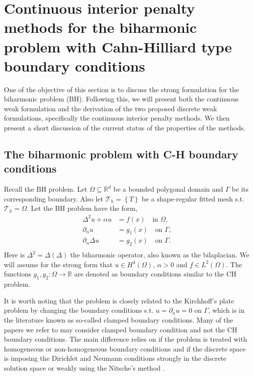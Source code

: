 
\section{Continuous interior penalty methods for the biharmonic problem with Cahn-Hilliard type boundary conditions}%
\label{sec:CIP_biharmonic_problem}

One of the objective of this section is to discuss the strong formulation for the biharmonic problem (BH).
Following this, we will present both the continuous weak formulation and the derivation of the two proposed discrete weak formulations, specifically the continuous interior penalty methods.
We then present a short discussion of the current status of the properties of the methods.

\subsection{The biharmonic problem with C-H boundary conditions}%
\label{sub:the_biharmonic_problem_with_c_h_boundary_conditions}

Recall the BH problem.
Let $\Omega \subseteq    \mathbb{R} ^d$ be a bounded polygonal domain and $\Gamma $ be its corresponding boundary. Also let $\mathcal{T}_{h} = \left\{ T \right\} $ be a shape-regular fitted mesh s.t. $\mathcal{T}_{h} = \Omega $. Let the BH problem have the form,
\begin{equation}
\label{eq:bi_problem}
\begin{split}
    \Delta^2  u  + \alpha  u  & = f( x)  \quad \text{in } \Omega,   \\
    \partial _{n} u & = g_{1}(x)   \quad \text{on } \Gamma ,  \\
    \partial _{n} \Delta  u & = g_{2}( x)   \quad \text{on } \Gamma .  \\
\end{split}
\end{equation}
Here is $\Delta ^2 = \Delta  \left( \Delta  \right) $ the biharmonic operator, also known as the bilaplacian. We will assume for the strong form that $u \in H^{4}\left( \Omega  \right) $, $\alpha  >0 $ and $f \in L^{2}\left( \Omega  \right)
$. The functions $g_{1},g_{2}: \Omega  \to \mathbb{R}$ are denoted as boundary conditions similar to the CH problem.

\begin{remark}
It is worth noting that the problem is closely related to the Kirchhoff's plate problem by changing the boundary conditions s.t. $u = \partial _{n } u = 0$ on $\Gamma $, which is in the literature known as so-called clamped boundary conditions.
Many of the papers we refer to may consider clamped boundary condition and not the CH boundary conditions. The main difference relies on if the problem is treated with homogeneous or non-homogeneous boundary conditions and if the discrete space is
imposing the Dirichlet and Neumann conditions strongly in the discrete solution space or weakly using the Nitsche's method \cite{nitsche1971variationsprinzip}.
\end{remark}

